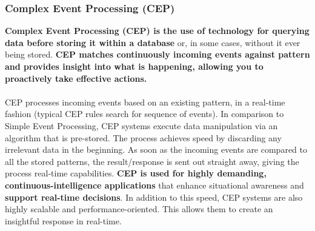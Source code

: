 \documentclass[10pt,a4paper]{article}
\newcommand{\nline}{\\~\\}
\begin{document}
\subsubsection{Complex Event Processing (CEP)}
\textbf{Complex Event Processing (CEP) is the use of technology for querying data before storing it within a database} or, in some cases, without it ever being stored. \textbf{CEP matches continuously incoming events against pattern and provides insight into what is happening, allowing you to proactively take effective actions. }
\nline
CEP processes incoming events based on an existing pattern, in a real-time fashion (typical CEP rules search for sequence of events). In comparison to Simple Event Processing, CEP systems execute data manipulation via an algorithm that is pre-stored. The process achieves speed by discarding any irrelevant data in the beginning. As soon as the incoming events are compared to all the stored patterns, the result/response is sent out straight away, giving the process real-time capabilities. \textbf{CEP is used for highly demanding, continuous-intelligence applications} that enhance situational awareness and \textbf{support real-time decisions}. In addition to this speed, CEP systems are also highly scalable and performance-oriented. This allows them to create an insightful response in real-time.
\end{document}
